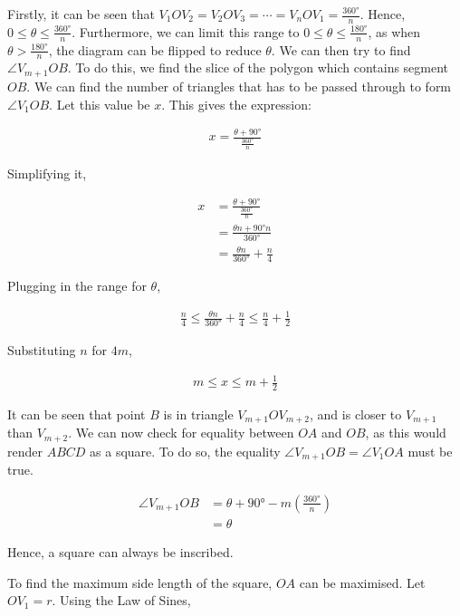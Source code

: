 \documentclass[12pt]{scrartcl}
\begin{document}
Firstly, it can be seen that $V_{1}OV_{2} = V_{2}OV_{3} = \cdots = V_{n}OV_{1} = \frac{\ang{360}}{n}$.
Hence, $0 \leq \theta \leq \frac{\ang{360}}{n}$.
Furthermore, we can limit this range to $0 \leq \theta \leq \frac{\ang{180}}{n}$, as when $\theta > \frac{\ang{180}}{n}$, the diagram can be flipped to reduce $\theta$.
We can then try to find $\angle V_{m+1}OB$. To do this, we find the slice of the polygon which contains segment $OB$. We can find the number of triangles that has to be passed through to form $\angle V_{1}OB$. Let this value be $x$. This gives the expression:

\begin{align*}
	 x = \frac{\theta + \ang{90}}{\frac{\ang{360}}{n}}
\end{align*}

Simplifying it,

\begin{align*}
	 x & = \frac{\theta + \ang{90}}{\frac{\ang{360}}{n}}   \\
	 & = \frac{\theta n + \ang{90} n}{\ang{360}} \\
	 & = \frac{\theta n}{\ang{360}} + \frac{n}{4}
\end{align*}

Plugging in the range for $\theta$,

\begin{align*}
	\frac{n}{4} \leq \frac{\theta n}{\ang{360}} + \frac{n}{4} \leq \frac{n}{4} + \frac{1}{2}
\end{align*}

Substituting $n$ for $4m$, 

\begin{align*}
	m \leq x \leq m + \frac{1}{2}
\end{align*}

It can be seen that point $B$ is in triangle $V_{m+1}OV_{m+2}$, and is closer to $V_{m+1}$ than $V_{m+2}$.
We can now check for equality between $OA$ and $OB$, as this would render $ABCD$ as a square.
To do so, the equality $\angle V_{m+1}OB = \angle V_{1}OA$ must be true.

\begin{align*}
	\angle V_{m+1}OB & = \theta + \ang{90} - m\left(\frac{\ang{360}}{n}\right)   \\
	& = \theta
\end{align*}

Hence, a square can always be inscribed.

To find the maximum side length of the square, $OA$ can be maximised. Let $OV_{1} = r$.
Using the Law of Sines,
\end{document}
